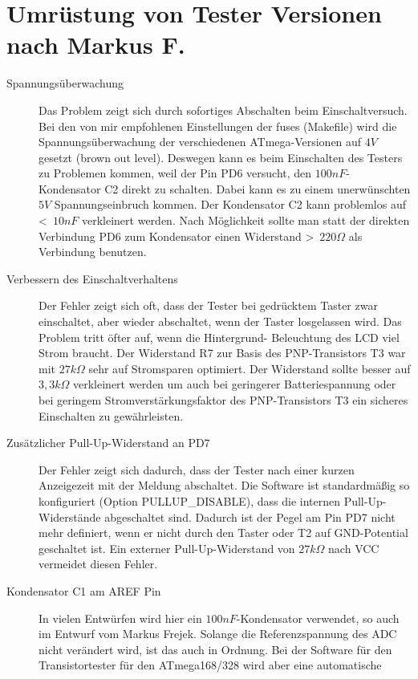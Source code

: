 \section{Umrüstung von Tester Versionen nach Markus F.}
\label{sec:change_markus}
\begin{description}

\item[Spannungsüberwachung]  
Das Problem zeigt sich durch sofortiges Abschalten beim Einschaltversuch.
Bei den von mir empfohlenen Einstellungen der fuses (Makefile) wird die Spannungsüberwachung der
verschiedenen ATmega-Versionen auf \(4V\) gesetzt (brown out level). Deswegen kann es beim
Einschalten des Testers zu Problemen kommen, weil der Pin PD6 versucht, den \(100nF\)-Kondensator C2
direkt zu schalten. Dabei kann es zu einem unerwünschten \(5V\) Spannungseinbruch kommen.
Der Kondensator C2 kann problemlos auf \textless~\(10nF\) verkleinert werden. Nach Möglichkeit sollte
man statt der direkten Verbindung PD6 zum Kondensator einen Widerstand \textgreater~\(220\Omega\) 
als Verbindung benutzen.
\item[Verbessern des Einschaltverhaltens]
Der Fehler zeigt sich oft, dass der Tester bei gedrücktem Taster zwar einschaltet, aber wieder
abschaltet, wenn der Taster losgelassen wird. Das Problem tritt öfter auf, wenn die Hintergrund-
Beleuchtung des LCD viel Strom braucht.
Der Widerstand R7 zur Basis des PNP-Transistors T3 war mit \(27k\Omega\) sehr auf Stromsparen
optimiert. Der Widerstand sollte besser auf \(3,3k\Omega\) verkleinert werden um auch bei
geringerer Batteriespannung oder bei geringem Stromverstärkungsfaktor des PNP-Transistors T3
ein sicheres Einschalten zu gewährleisten.
\item[Zusätzlicher Pull-Up-Widerstand an PD7]
Der Fehler zeigt sich dadurch, dass der Tester nach einer kurzen Anzeigezeit mit der Meldung
		 abschaltet. Die Software ist standardmäßig so konfiguriert (Option PULLUP\_DISABLE),
dass die internen Pull-Up-Widerstände abgeschaltet sind.
Dadurch ist der Pegel am Pin PD7 nicht mehr definiert,
wenn er nicht durch den Taster oder T2 auf GND-Potential geschaltet ist. Ein externer
Pull-Up-Widerstand von \(27k\Omega\) nach VCC vermeidet diesen Fehler.
\item[Kondensator C1 am AREF Pin]
In vielen Entwürfen wird hier ein \(100nF\)-Kondensator verwendet, so auch im Entwurf vom Markus Frejek.
Solange die Referenzspannung des ADC nicht verändert wird, ist das auch in Ordnung.
Bei der Software für den Transistortester für den ATmega168/328 wird aber eine automatische

\end{description}
